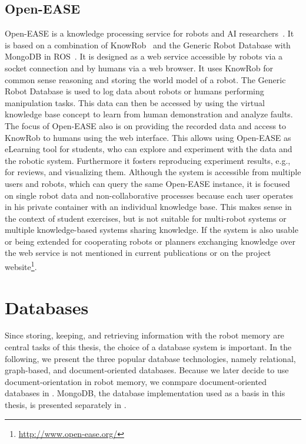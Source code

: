 \subsection{Open-EASE}
\label{sec:openease}
Open-EASE is a knowledge processing service for robots and AI
researchers~\cite{OpenEASE}. It is based on a combination of
KnowRob~\cite{KnowRob} and the Generic Robot Database with MongoDB in
ROS~\cite{RoboDB}. It is designed as a web service accessible by
robots via a socket connection and by humans via a web browser. It
uses KnowRob for common sense reasoning and storing the world model of
a robot. The Generic Robot Database is used to log data about robots
or humans performing manipulation tasks. This data can then be
accessed by using the virtual knowledge base concept to learn from
human demonstration and analyze faults. The focus of Open-EASE also is
on providing the recorded data and access to KnowRob to humans using
the web interface. This allows using Open-EASE as eLearning tool for
students, who can explore and experiment with the data and the robotic
system. Furthermore it fosters reproducing experiment results, e.g.,
for reviews, and visualizing them. Although the system is
accessible from multiple users and robots, which can query the same
Open-EASE instance, it is focused on single robot data and
non-collaborative processes because each user operates in his private
container with an individual knowledge base. This makes sense in the
context of student exercises, but is not suitable for multi-robot
systems or multiple knowledge-based systems sharing knowledge. If the
system is also usable or being extended for cooperating robots or
planners exchanging knowledge over the web service is not mentioned in
current publications or on the project
website\footnote{\url{http://www.open-ease.org/}}.


\section{Databases}
\label{sec:databases}
Since storing, keeping, and retrieving information with the robot
memory are central tasks of this thesis, the choice of a database
system is important. In the following, we present the three popular
database technologies, namely relational, graph-based, and
document-oriented databases. Because we later decide to use
document-orientation in robot memory, we conmpare document-oriented
databases in . MongoDB, the database
implementation used as a basis in this thesis, is presented separately
in .


